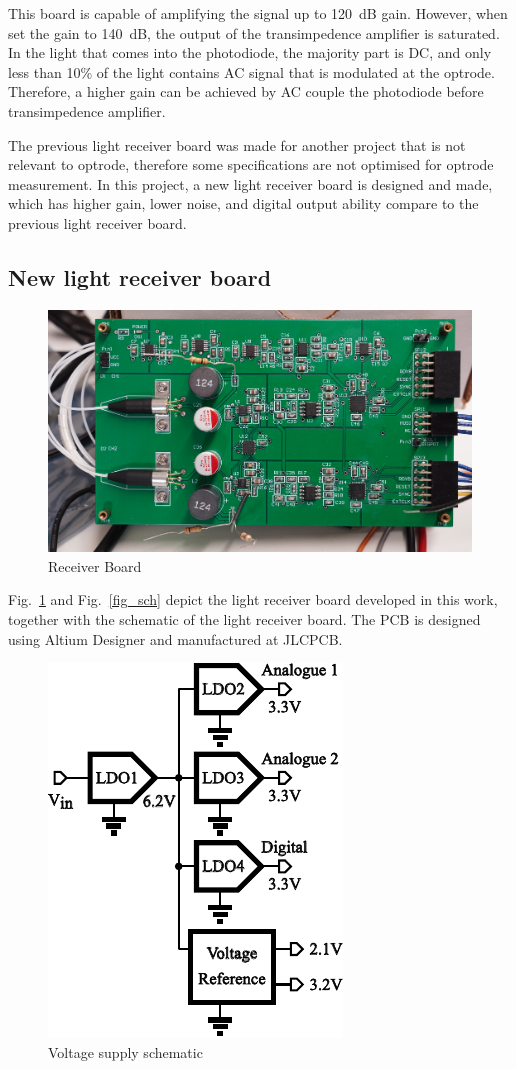This board is capable of amplifying the signal up to \qty{120}{dB} gain.  However, when set the gain to \qty{140}{dB}, the output of the transimpedence amplifier is saturated.  In the light that comes into the photodiode, the majority part is DC, and only less than 10\% of the light contains AC signal that is modulated at the optrode.  Therefore, a higher gain can be achieved by AC couple the photodiode before transimpedence amplifier.

The previous light receiver board was made for another project that is not relevant to optrode, therefore some specifications are not optimised for optrode measurement.  In this project, a new light receiver board is designed and made, which has higher gain, lower noise, and digital output ability compare to the previous light receiver board.

\subsection{New light receiver board}

\begin{figure}[H]
\centering
\includegraphics[width=0.9\linewidth]{4-ANC_Sys/ReceiverBoard.jpg}
\caption{Receiver Board}
\label{fig_ReceiverBoard}
\end{figure}

Fig.~\ref{fig_ReceiverBoard} and Fig.~\ref{fig_sch} depict the light receiver board developed in this work, together with the schematic of the light receiver board.  The PCB is designed using Altium Designer and manufactured at JLCPCB.

\begin{figure}[H]
\centering
\includegraphics[width=0.4\linewidth]{4-ANC_Sys/PowerSupSch.pdf}
\caption{Voltage supply schematic}
\label{fig_PowerSupSch}
\end{figure}

